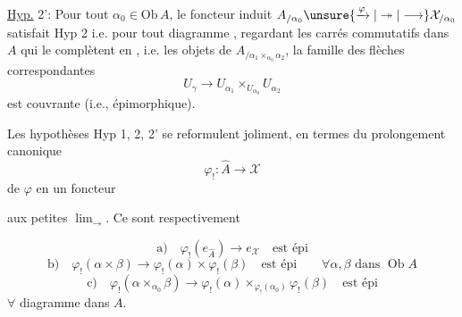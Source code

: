 \uline{Hyp.} 2': Pour tout $\alpha_0\in\mathrm{Ob}\,A$, le foncteur induit $A_{/\alpha_0}\unsure{\xrightarrow{\varphi}|\twoheadrightarrow|\longrightarrow}\mathcal X_{/\alpha_0}$ satisfait  Hyp 2 i.e. pour tout diagramme
, regardant les carrés commutatifs dans $A$ qui le complètent en
, i.e. les objets de $A_{/\alpha_1\times_{\alpha_0}\alpha_2}$, la famille des flèches correspondantes
\[U_\gamma\longrightarrow U_{\alpha_1}\times_{U_{\alpha_0}}U_{\alpha_2}\]
est couvrante (i.e., épimorphique).

Les hypothèses Hyp 1, 2, 2' se reformulent joliment, en termes du prolongement canonique
\[\varphi_!:\widehat A\longrightarrow\mathcal X\]
de $\varphi$ en un foncteur   aux petites $\lim_{\longrightarrow}$. Ce sont respectivement


\[
\text{a)}\quad \varphi_!(e_{\widehat A})\longrightarrow e_{\mathcal X}\quad\text{est épi}
\]
\[
\text{b)}\quad \varphi_!(\alpha\times\beta)\longrightarrow
\varphi_!(\alpha)\times\varphi_!(\beta)\quad\text{est épi}
\qquad \forall\alpha,\beta\text{ dans }\operatorname{Ob}A
\]
\[
\text{c)}\quad \varphi_!(\alpha\times_{\alpha_0}\beta)\longrightarrow
\varphi_!(\alpha)\times_{\varphi_!(\alpha_0)}\varphi_!(\beta)\quad\text{est épi}
\]
$\forall$ diagramme
dans $A$.

